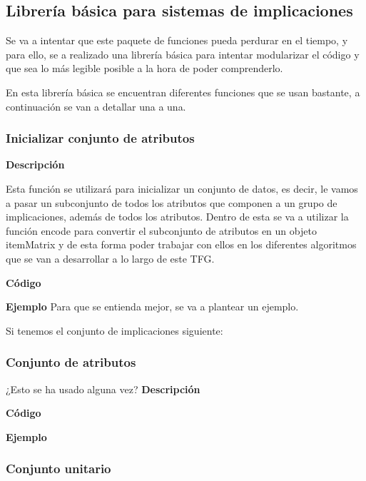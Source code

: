 \subsection{Librer\'ia b\'asica para sistemas de implicaciones}
Se va a intentar que este paquete de funciones pueda perdurar en el tiempo, y para ello, 
se a realizado una librer\'ia b\'asica para intentar modularizar el c\'odigo y que sea lo 
m\'as legible posible a la hora de poder comprenderlo.

En esta librer\'ia b\'asica se encuentran diferentes funciones que se usan bastante, a continuaci\'on 
se van a detallar una a una.




\subsubsection{Inicializar conjunto de atributos}

    \textbf{Descripci\'on}

    Esta funci\'on se utilizar\'a para inicializar un conjunto de datos, es decir, le vamos a pasar un subconjunto 
    de todos los atributos que componen a un grupo de implicaciones, adem\'as de todos los atributos. Dentro de esta 
    se va a utilizar la funci\'on encode para convertir el subconjunto de atributos en un objeto itemMatrix y de esta 
    forma poder trabajar con ellos en los diferentes algoritmos que se van a desarrollar a lo largo de este TFG.


    \textbf{C\'odigo}



    \textbf{Ejemplo}
    Para que se entienda mejor, se va a plantear un ejemplo. 

    Si tenemos el conjunto de implicaciones siguiente: 





\subsubsection{Conjunto de atributos}
    ¿Esto se ha usado alguna vez?
    \textbf{Descripci\'on}
    

    \textbf{C\'odigo}

    
    \textbf{Ejemplo}



\subsubsection{Conjunto unitario}

